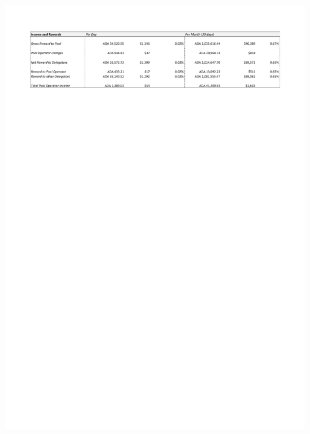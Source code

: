 \documentclass[11pt,a4paper,dvipsnames,twosided]{article}
\begin{document}
\hspace{-0.65in}\begin{minipage}{\textwidth}
  \includegraphics[width=1.2\textwidth]{RC3.pdf}

\end{minipage}
\end{document}
